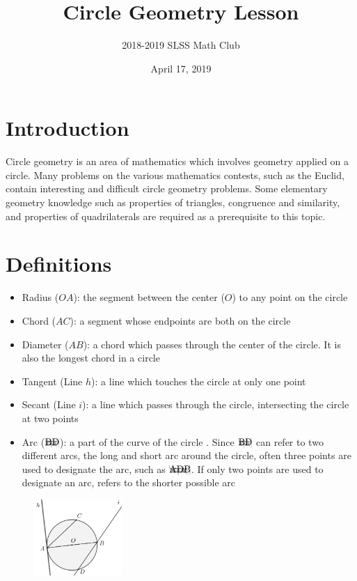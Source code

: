 \documentclass[12pt]{article}
\title{Circle Geometry Lesson\vspace{-3mm}}
\author{2018-2019 SLSS Math Club\vspace{-5mm}}
\date{April 17, 2019\vspace{-5mm}}
\newcommand{\arc}[1]{{%
		\setbox9=\hbox{#1}%
		\ooalign{\resizebox{\wd9}{\height}{\texttoptiebar{\phantom{A}}}\cr#1}}}
\begin{document}
\maketitle
\section{Introduction}
Circle geometry is an area of mathematics which involves geometry applied on a circle. Many problems on the various mathematics contests, such as the Euclid, contain interesting and difficult circle geometry problems. Some elementary geometry knowledge such as properties of triangles, congruence and similarity, and properties of quadrilaterals are required as a prerequisite to this topic.

\section{Definitions}
\begin{itemize}
	\item Radius ($OA$): the segment between the center ($O$) to any point on the circle
	\item Chord ($AC$): a segment whose endpoints are both on the circle
	\item Diameter ($AB$): a chord which passes through the center of the circle. It is also the longest chord in a circle
	\item Tangent (Line $h$): a line which touches the circle at only one point
	\item Secant (Line $i$): a line which passes through the circle, intersecting the circle at two points
	\item Arc ($\arc{BD}$): a part of the curve of the circle
	. Since $\arc{BD}$ can refer to two different arcs, the long and short arc around the circle, often three points are used to designate the arc, such as $\arc{ADB}$. If only two points are used to designate an arc, refers to the shorter possible arc
\end{itemize}

\begin{figure}[h!]
\centering
\includegraphics[width=0.3\textwidth]{Graphics/Week_13/GeometryDiagram.png}
\end{figure}
\end{document}
